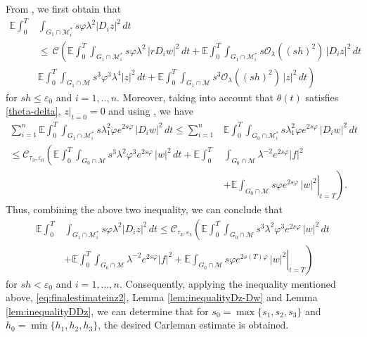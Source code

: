 \documentclass[11pt,oneside,leqno]{amsart}
\numberwithin{equation}{section}
\numberwithin{equation}{section}
\newcommand{\E}{\mathbb{E}}
\begin{document}
{ 
From \cite[Lemma 2.10]{LPP:2025}, we first obtain that
\begin{equation*}
        \begin{split}
        \E\int_0^T&\int_{G_{1}\cap\mathcal{M}_i^{\ast}}s\varphi\lambda^2|D_iz|^2\,dt\\
        &\leq\, \mathcal{C}\left(\E\int_0^T\int_{G_{1}\cap\mathcal{M}_i^{\ast}}s\varphi\lambda^2\,|rD_iw|^2\,dt+\E\int_0^T\int_{G_{1}\cap \mathcal{M}_{i}^{\ast}}s\mathcal{O}_{\lambda}((sh)^2)\,|D_iz|^2\,dt\right.\\
        &\left. \E\int_0^T\int_{G_{1}\cap\mathcal{M}}s^3\varphi^3\lambda^4|z|^2\,dt+\E\int_0^T\int_{G_{1}\cap\mathcal{M}}s^3\mathcal{O}_{\lambda}((sh)^2)\,|z|^2\,dt\right)
    \end{split}
\end{equation*}
for $sh\leq \varepsilon_0$ and $i=1,..,n$. Moreover, taking into account that $\theta(t)$ satisfies \eqref{theta-delta}, $\left.z\right|_{t=0}=0$ and using \cite[Lemma 2.12]{LPP:2025}, we have
\begin{equation*}
    \begin{split}
            \sum_{i=1}^{n}\E\int_0^T\int_{G_{1}\cap\mathcal{M}_{i}^{\ast}}s\lambda^{2}_{1}\varphi e^{2s\varphi}\,|D_{i}w|^{2}\,dt\leq \sum_{i=1}^{n}&\E\int_0^T\int_{G_{0}\cap\mathcal{M}_{i}^{\ast}}s\lambda^{2}_{1}\varphi e^{2s\varphi}\,|D_{i}w|^{2}\,dt\\
            \leq \mathcal{C}_{\tau_3,\varepsilon_0}\left(\E\int_0^T\int_{G_{0}\cap\mathcal{M}}s^3\lambda^2\varphi ^3e^{2s\varphi}\,|w|^2\,dt+\E\int_0^T\right.&\int_{G_{0}\cap\mathcal{M}}\lambda^{-2}e^{2s\varphi}|f|^2\\
            &\left.+\left.\E\int_{G_{0}\cap\mathcal{M}}s\varphi e^{2s\varphi}\,|w|^2\right|_{t=T}\right).
        \end{split}
\end{equation*}
Thus, combining the above two inequality, we can conclude that
\begin{equation}
    \begin{split}
        \E\int_0^T&\int_{G_{1}\cap\mathcal{M}_i^{\ast}}s\varphi\lambda^2|D_iz|^2\,dt \leq \mathcal{C}_{\tau_3,\varepsilon_3}\left(\E\int_0^T\int_{G_{0}\cap\mathcal{M}}s^3\lambda^2\varphi ^3e^{2s\varphi}\,|w|^2\,dt\right.\\
            &\left.+\E\int_0^T\int_{G_{0}\cap\mathcal{M}}\lambda^{-2}e^{2s\varphi}|f|^2+\left.\E\int_{G_{0}\cap\mathcal{M}}s\varphi e^{2s(T)\varphi}\,|w|^2\right|_{t=T}\right)
    \end{split}
\end{equation}
for $sh<\varepsilon_0$ and $i=1,\ldots,n$.} Consequently, applying the inequality mentioned above, \eqref{eq:finalestimateinz2}, Lemma \ref{lem:inequalityDz-Dw} and Lemma \ref{lem:inequalityDDz}, we can determine that for $s_0=\max\{s_1,s_2,s_3\}$ and $h_0=\min\{h_1,h_2,h_3\}$, the desired Carleman estimate is obtained.
\end{document}
